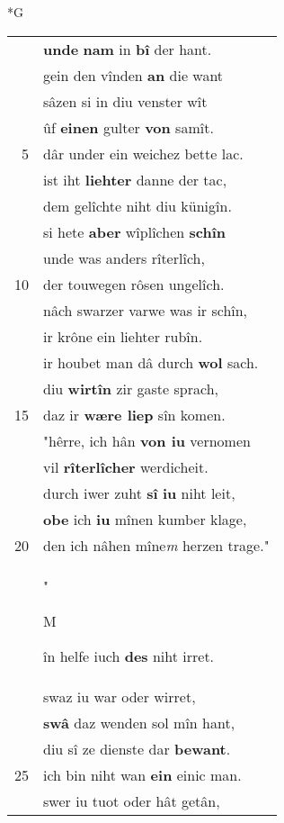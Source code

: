 \documentclass[8pt,a4paper,notitlepage]{article}
\begin{document}
\newpage
\begin{table}[ht]
\begin{minipage}[t]{0.5\linewidth}
\small
\begin{center}*G
\end{center}
\begin{tabular}{rl}
 & \textbf{unde} \textbf{nam} in \textbf{bî} der hant.\\ 
 & gein den vînden \textbf{an} die want\\ 
 & sâzen si in diu venster wît\\ 
 & ûf \textbf{einen} gulter \textbf{von} samît.\\ 
5 & dâr under ein weichez bette lac.\\ 
 & ist iht \textbf{liehter} danne der tac,\\ 
 & dem gelîchte niht diu künigîn.\\ 
 & si hete \textbf{aber} wîplîchen \textbf{schîn}\\ 
 & unde was anders rîterlîch,\\ 
10 & der touwegen rôsen ungelîch.\\ 
 & nâch swarzer varwe was ir schîn,\\ 
 & ir krône ein liehter rubîn.\\ 
 & ir houbet man dâ durch \textbf{wol} sach.\\ 
 & diu \textbf{wirtîn} zir gaste sprach,\\ 
15 & daz ir \textbf{wære liep} sîn komen.\\ 
 & "hêrre, ich hân \textbf{von iu} vernomen\\ 
 & vil \textbf{rîterlîcher} werdicheit.\\ 
 & durch iwer zuht \textbf{sî} \textbf{iu} niht leit,\\ 
 & \textbf{obe} ich \textbf{iu} mînen kumber klage,\\ 
20 & den ich nâhen mîne\textit{m} herzen trage."\\ 
 & "\begin{large}M\end{large}în helfe iuch \textbf{des} niht irret.\\ 
 & swaz iu war oder wirret,\\ 
 & \textbf{swâ} daz wenden sol mîn hant,\\ 
 & diu sî ze dienste dar \textbf{bewant}.\\ 
25 & ich bin niht wan \textbf{ein} einic man.\\ 
 & swer iu tuot oder hât getân,\\ 

\end{tabular}
\end{minipage}
\end{table}
\end{document}

